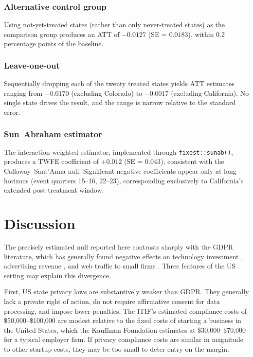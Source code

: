 \documentclass[12pt]{article}
\begin{document}
\subsubsection*{Alternative control group} Using not-yet-treated states (rather than only never-treated states) as the comparison group produces an ATT of $-0.0127$ (SE = $0.0183$), within 0.2 percentage points of the baseline.

\subsubsection*{Leave-one-out} Sequentially dropping each of the twenty treated states yields ATT estimates ranging from $-0.0170$ (excluding Colorado) to $-0.0017$ (excluding California). No single state drives the result, and the range is narrow relative to the standard error.

\subsubsection*{Sun--Abraham estimator} The \citet{sun2021} interaction-weighted estimator, implemented through \texttt{fixest::sunab()}, produces a TWFE coefficient of $+0.012$ (SE = $0.043$), consistent with the Callaway--Sant'Anna null. Significant negative coefficients appear only at long horizons (event quarters 15--16, 22--23), corresponding exclusively to California's extended post-treatment window.




\section{Discussion}
\label{sec:discussion}

The precisely estimated null reported here contrasts sharply with the GDPR literature, which has generally found negative effects on technology investment \citep{jia2021}, advertising revenue \citep{goldberg2024}, and web traffic to small firms \citep{peukert2022}. Three features of the US setting may explain this divergence.

First, US state privacy laws are substantively weaker than GDPR. They generally lack a private right of action, do not require affirmative consent for data processing, and impose lower penalties. The ITIF's estimated compliance costs of \$50,000--\$100,000 are modest relative to the fixed costs of starting a business in the United States, which the Kauffman Foundation estimates at \$30,000--\$70,000 for a typical employer firm. If privacy compliance costs are similar in magnitude to other startup costs, they may be too small to deter entry on the margin.
\end{document}

